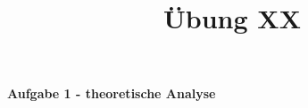 \documentclass[a4paper,11pt]{scrartcl}
\title{Übung XX}
\begin{document}
\begin{center}
\LARGE{\textbf{Aufgabe 1 - theoretische Analyse}}
\end{center}
\end{document}
